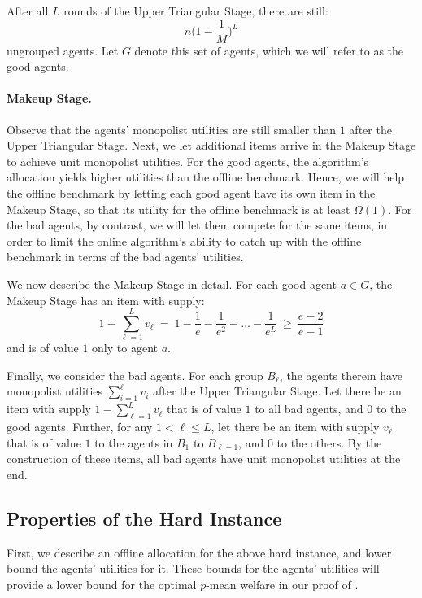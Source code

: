 \documentclass[11pt,letterpaper]{article}
\begin{document}
After all $L$ rounds of the Upper Triangular Stage, there are still:
\[
	n \Big(1 - \frac{1}{M}\Big)^L
\]
ungrouped agents.
Let $G$ denote this set of agents, which we will refer to as the good agents.

\paragraph{Makeup Stage.}
Observe that the agents' monopolist utilities are still smaller than $1$ after the Upper Triangular Stage. 
Next, we let additional items arrive in the Makeup Stage to achieve unit monopolist utilities.
For the good agents, the algorithm's allocation yields higher utilities than the offline benchmark.
Hence, we will help the offline benchmark by letting each good agent have its own item in the Makeup Stage, so that its utility for the offline benchmark is at least $\Omega(1)$.
For the bad agents, by contrast, we will let them compete for the same items, in order to limit the online algorithm's ability to catch up with the offline benchmark in terms of the bad agents' utilities. 

We now describe the Makeup Stage in detail.
For each good agent $a \in G$, the Makeup Stage has an item with supply: \begin{equation}
	\label{eqn:nashian-hardness-good-agent}
	1 - \sum_{\ell=1}^L v_\ell ~=~ 1 - \frac{1}{e} - \frac{1}{e^2} - \dots - \frac{1}{e^L} ~\ge~ \frac{e-2}{e-1}
\end{equation}
and is of value $1$ only to agent $a$.


Finally, we consider the bad agents.
For each group $B_\ell$, the agents therein have monopolist utilities $\sum_{i=1}^\ell v_i$ after the Upper Triangular Stage.
Let there be an item with supply $1 - \sum_{\ell=1}^L v_\ell$ that is of value $1$ to all bad agents, and $0$ to the good agents.
Further, for any $1 < \ell \le L$, let there be an item with supply $v_\ell$ that is of value $1$ to the agents in $B_1$ to $B_{\ell-1}$, and $0$ to the others.
By the construction of these items, all bad agents have unit monopolist utilities at the end.






\subsection{Properties of the Hard Instance}

First, we describe an offline allocation for the above hard instance, and lower bound the agents' utilities for it.
These bounds for the agents' utilities will provide a lower bound for the optimal $p$-mean welfare in our proof of .
\end{document}
